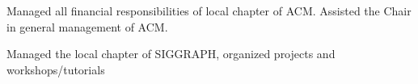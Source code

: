 \begin{resume}
\begin{position}
Managed all financial responsibilities of local chapter of ACM.  Assisted the Chair in general management of ACM.
\end{position}

\begin{position}
Managed the local chapter of SIGGRAPH, organized projects and workshops/tutorials
\end{position}






\end{resume}

